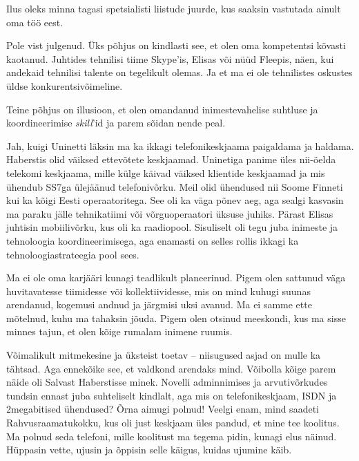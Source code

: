 
Ilus oleks minna tagasi spetsialisti liistude juurde, kus saaksin 
vastutada ainult oma töö eest. 


Pole vist julgenud. Üks põhjus on kindlasti see, et olen oma kompetentsi 
kõvasti kaotanud. Juhtides 
tehnilisi tiime Skype'is, Elisas või nüüd Fleepis, näen, kui andekaid tehnilisi talente on tegelikult olemas. Ja et ma ei ole
tehnilistes oskustes üldse konkurentsivõimeline.


Teine põhjus on illusioon, et olen omandanud inimestevahelise suhtluse ja 
koordineerimise \emph{skill}'id ja 
parem sõidan nende peal.


Jah, kuigi Uninetti läksin ma ka ikkagi telefonikeskjaama paigaldama ja haldama. Haberstis olid väiksed ettevõtete keskjaamad. Uninetiga panime üles nii-öelda telekomi keskjaama, 
mille külge käivad väiksed klientide keskjaamad ja mis 
ühendub SS7ga ülejäänud telefonivõrku. Meil olid ühendused nii Soome 
Finneti kui ka kõigi Eesti operaatoritega. See oli ka väga põnev aeg, aga sealgi kasvasin ma 
paraku jälle tehnikatiimi või võrguoperaatori üksuse 
juhiks. Pärast Elisas juhtisin mobiilivõrku, kus oli ka raadiopool. 
Sisuliselt oli tegu juba inimeste ja tehnoloogia koordineerimisega, aga enamasti on selles 
rollis ikkagi ka tehnoloogiastrateegia pool sees. 


Ma ei ole oma karjääri kunagi teadlikult planeerinud. Pigem olen sattunud väga huvitavatesse tiimidesse 
või kollektiividesse, mis on mind kuhugi suunas arendanud, 
kogemusi andnud ja järgmisi uksi avanud. Ma ei samme ette mõtelnud, 
kuhu ma tahaksin jõuda. Pigem olen otsinud meeskondi, kus ma 
sisse minnes tajun, et olen kõige rumalam inimene ruumis. 


Võimalikult mitmekesine ja üksteist toetav -- 
niisugused asjad on mulle ka tähtsad. Aga ennekõike see, et valdkond arendaks mind. Võibolla kõige parem 
näide oli Salvast Haberstisse minek. Novelli adminnimises ja 
arvutivõrkudes tundsin ennast juba suhteliselt kindlalt, aga mis on telefonikeskjaam, ISDN ja 2megabitised ühendused? Õrna aimugi 
polnud! Veelgi enam, mind saadeti Rahvusraamatukokku, kus oli just keskjaam 
üles pandud, et mine tee koolitus. Ma polnud seda telefoni, mille koolitust ma tegema pidin, kunagi elus näinud. Hüppasin vette, ujusin ja õppisin selle käigus, kuidas ujumine käib. 

